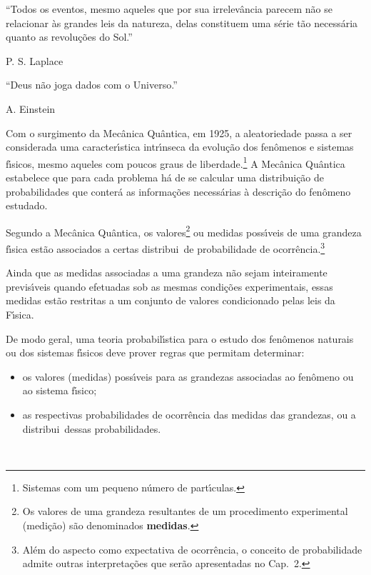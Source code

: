 \begin{center}
\begin{minipage}{10cm}
 ``Todos os eventos, mesmo aqueles que por sua ir\-re\-le\-v\^{a}n\-cia parecem n\~{a}o se relacionar \`{a}s grandes leis da natureza, delas constituem uma s\'{e}rie t\~{a}o necess\'{a}ria quanto as revolu\c{c}\~{o}es do Sol.''

\smallskip
\hfill P. S. Laplace
\end{minipage}
\end{center}

\begin{center}
\begin{minipage}{10cm}
 ``Deus n\~{a}o joga dados com o Universo.''

\smallskip
\hfill A. Einstein
\end{minipage}
\end{center}





Com o surgimento da Mec\^{a}nica Qu\^{a}ntica, em 1925, a aleatoriedade passa a ser considerada uma caracter\'{\i}stica intr\'{\i}nseca da evolu\c{c}\~{a}o dos fen\^{o}menos e sistemas f\'{\i}sicos, mesmo aqueles com poucos graus de liberdade.\footnote{Sistemas com um pequeno n\'{u}mero de part\'{\i}culas.}  A Mec\^{a}nica Qu\^{a}ntica estabelece que para cada problema h\'{a} de se calcular uma distribui\c{c}\~{a}o de probabilidades que conter\'{a} as informa\c{c}\~{o}es necess\'{a}rias \`{a} descri\c{c}\~{a}o do fen\^{o}meno estudado.

Segundo a Mec\^{a}nica Qu\^{a}ntica\cite{DIRAC}, os valores\footnote{Os valores de uma grandeza resultantes de um procedimento experimental (medi\c{c}\~{a}o) s\~{a}o denominados {\bf medidas}.} ou medidas poss\'{\i}veis de uma  grandeza f\'{\i}sica est\~{a}o associados a certas distribui\coes\ de probabilidade de ocorr\^encia.\footnote{Al\'{e}m do aspecto como expectativa de ocorr\^{e}ncia, o conceito de probabilidade admite outras interpreta\c{c}\~{o}es que ser\~{a}o apresentadas no Cap.~2.}

 Ainda que as medidas as\-so\-ci\-a\-das a uma grandeza n\~{a}o sejam inteiramente previs\'{\i}veis quando efetuadas sob as mesmas condi\c{c}\~{o}es experimentais,  essas medidas est\~{a}o  restritas a um conjunto de valores  condicionado pelas leis da F\'{\i}sica.


De modo geral,  uma teoria probabil\'{\i}stica para o estudo dos fen\^omenos naturais ou dos sistemas f\'{\i}sicos deve prover regras que permitam determinar:
\begin{itemize}
\vspace{-0.2cm}
\item os valores (medidas) poss\'{\i}veis para as  grandezas associadas ao  fen\^omeno ou ao sistema  f\'{\i}sico;
\vspace{-0.2cm}
\item as respectivas pro\-ba\-bi\-li\-da\-des de ocorr\^encia das medidas das  grandezas, ou a distribui\cao\ dessas pro\-ba\-bi\-li\-da\-des.
\end{itemize}


\newpage \ \\
\thispagestyle{empty}





